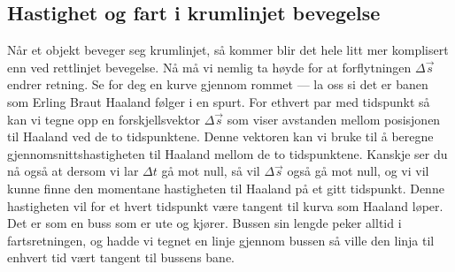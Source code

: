 
\subsection*{Hastighet og fart i krumlinjet bevegelse} 
Når et objekt beveger seg krumlinjet, så kommer blir det hele litt mer komplisert enn ved rettlinjet bevegelse. Nå må vi nemlig ta høyde for at forflytningen $\Delta \vec{s}$ endrer retning. Se for deg en kurve gjennom rommet — la oss si det er banen som Erling Braut Haaland følger i en spurt. For ethvert par med tidspunkt så kan vi tegne opp en forskjellsvektor $\Delta\vec{s}$ som viser avstanden mellom posisjonen til Haaland ved de to tidspunktene. Denne vektoren kan vi bruke til å beregne gjennomsnittshastigheten til Haaland mellom de to tidspunktene. Kanskje ser du nå også at dersom vi lar $\Delta t$ gå mot null, så vil $\Delta\vec{s}$ også gå mot null, og vi vil kunne finne den momentane hastigheten til Haaland på et gitt tidspunkt. Denne hastigheten vil for et hvert tidspunkt være tangent til kurva som Haaland løper. Det er som en buss som er ute og kjører. Bussen sin lengde peker alltid i fartsretningen, og hadde vi tegnet en linje gjennom bussen så ville den linja til enhvert tid vært tangent til bussens bane.

